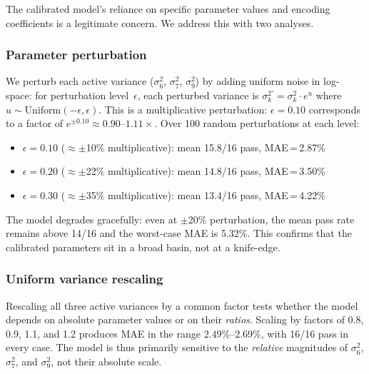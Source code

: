 \documentclass[journal]{IEEEtran}
\begin{document}
The calibrated model's reliance on specific parameter values and encoding coefficients is a legitimate concern.
We address this with two analyses.

\subsubsection{Parameter perturbation}
We perturb each active variance ($\sigma_6^2$, $\sigma_7^2$, $\sigma_9^2$) by adding uniform noise in log-space: for perturbation level~$\epsilon$, each perturbed variance is $\sigma_k^{2\prime} = \sigma_k^2 \cdot e^{u}$ where $u \sim \mathrm{Uniform}(-\epsilon, \epsilon)$.
This is a multiplicative perturbation: $\epsilon = 0.10$ corresponds to a factor of $e^{\pm 0.10} \approx 0.90\text{--}1.11\times$.
Over 100 random perturbations at each level:
\begin{itemize}
    \item $\epsilon = 0.10$ ($\approx$$\pm$10\% multiplicative): mean 15.8/16 pass, MAE\,=\,2.87\%
    \item $\epsilon = 0.20$ ($\approx$$\pm$22\% multiplicative): mean 14.8/16 pass, MAE\,=\,3.50\%
    \item $\epsilon = 0.30$ ($\approx$$\pm$35\% multiplicative): mean 13.4/16 pass, MAE\,=\,4.22\%
\end{itemize}
The model degrades gracefully: even at $\pm$20\% perturbation, the mean pass rate remains above 14/16 and the worst-case MAE is 5.32\%.
This confirms that the calibrated parameters sit in a broad basin, not at a knife-edge.

\subsubsection{Uniform variance rescaling}
Rescaling all three active variances by a common factor tests whether the model depends on absolute parameter values or on their \emph{ratios}.
Scaling by factors of 0.8, 0.9, 1.1, and 1.2 produces MAE in the range 2.49\%--2.69\%, with 16/16 pass in every case.
The model is thus primarily sensitive to the \emph{relative} magnitudes of $\sigma_6^2$, $\sigma_7^2$, and $\sigma_9^2$, not their absolute scale.
\end{document}
